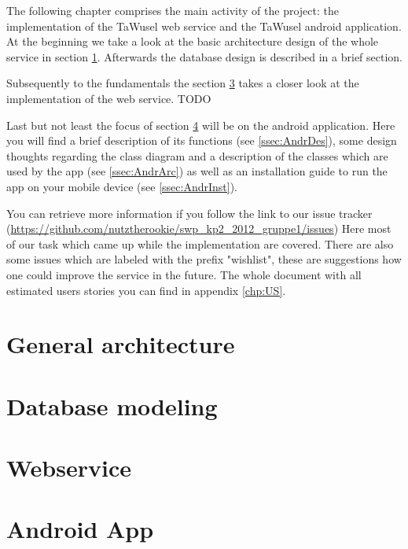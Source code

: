 
The following chapter comprises the main activity of the project: the implementation of the TaWusel web service and the TaWusel android application. At the beginning we take a look at the basic architecture design of the whole service in section \ref{sec:GArc}. Afterwards the database design is described in a brief section.

\emptyRow
Subsequently to the fundamentals the section \ref{sec:Webs} takes a closer look at the implementation of the web service. TODO

\emptyRow
Last but not least the focus of section \ref{sec:Andr} will be on the android application. Here you will find a brief description of its functions (see \ref{ssec:AndrDes}), some design thoughts regarding the class diagram and a description of the classes which are used by the app (see \ref{ssec:AndrArc}) as well as an installation guide to run the app on your mobile device (see \ref{ssec:AndrInst}). 

\emptyRow
You can retrieve more information if you follow the link to our issue tracker (\url{https://github.com/nutztherookie/swp_kp2_2012_gruppe1/issues}) Here most of our task which came up while the implementation are covered. There are also some issues which are labeled with the prefix "wishlist", these are suggestions how one could improve the service in the future. The whole document with all estimated users stories you can find in appendix \ref{chp:US}.

\clearpage

\section{General architecture}\label{sec:GArc}


\clearpage
\section{Database modeling}


\clearpage
\section{Webservice}\label{sec:Webs}


\clearpage
\section{Android App}\label{sec:Andr}



